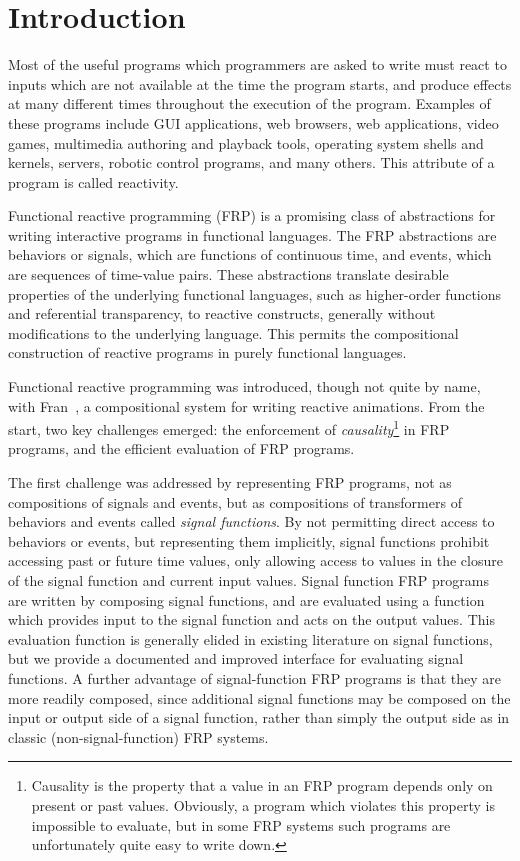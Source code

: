 \chapter{Introduction}
\label{chapter:Introduction}

Most of the useful programs which programmers are asked to write must react to inputs which are not available at the time the program starts,
and produce effects at many different times throughout the execution of the program. Examples of these programs include GUI applications,
web browsers, web applications, video games, multimedia authoring and playback tools, operating system shells and kernels, servers,
robotic control programs, and many others. This attribute of a program is called reactivity.

Functional reactive programming (FRP) is a promising class of abstractions for
writing interactive programs in functional languages. The FRP abstractions are
behaviors or signals, which are functions of continuous time, and events, which
are sequences of time-value pairs. These abstractions translate desirable
properties of the underlying functional languages, such as higher-order
functions and referential transparency, to reactive constructs, generally
without modifications to the underlying language. This permits the compositional
construction of reactive programs in purely functional languages.

Functional reactive programming was introduced, though not quite by name, with Fran~\cite{Elliott1997}, a compositional system for writing
reactive animations. From the start, two key challenges emerged: the enforcement of {\em causality}\footnote{Causality is the property 
that a value in an FRP program depends only on present or past values. Obviously, a program which violates this property is impossible to
evaluate, but in some FRP systems such programs are unfortunately quite easy to write down.} in FRP programs, and the efficient
evaluation of FRP programs.

The first challenge was addressed by representing FRP programs, not as
compositions of signals and events, but as compositions of transformers of
behaviors and events called {\em signal functions}. By not permitting direct
access to behaviors or events, but representing them implicitly, signal
functions prohibit accessing past or future time values, only allowing access to
values in the closure of the signal function and current input values. Signal
function FRP programs are written by composing signal functions, and are
evaluated using a function which provides input to the signal function and acts
on the output values. This evaluation function is generally elided in existing
literature on signal functions, but we provide a documented and improved
interface for evaluating signal functions. A further advantage of
signal-function FRP programs is that they are more readily composed,
since additional signal functions may be composed on the input or output side of
a signal function, rather than simply the output side as in classic
(non-signal-function) FRP systems.

